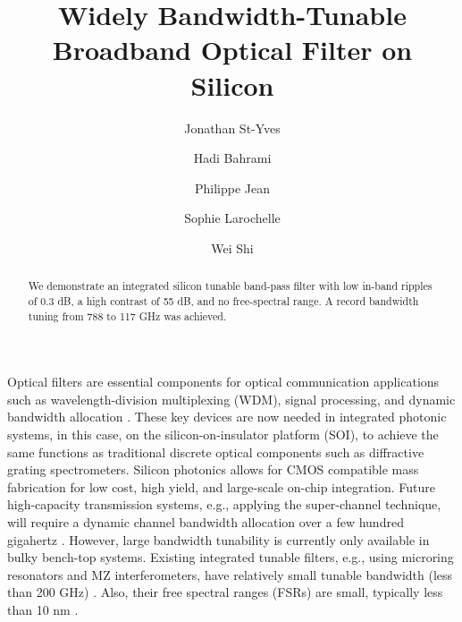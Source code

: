 \documentclass[osajnl,twocolumn,showpacs,superscriptaddress,10pt]{revtex4-1}
\begin{document}
\title{Widely Bandwidth-Tunable Broadband Optical Filter on Silicon}

\author{Jonathan St-Yves} 
\author{Hadi Bahrami}
\author{Philippe Jean}
\author{Sophie Larochelle}
\author{Wei Shi}


\begin{abstract}
We demonstrate an integrated silicon tunable band-pass filter with low in-band ripples of 0.3 dB, a high contrast of 55 dB, and no free-spectral range. A record bandwidth tuning from 788 to 117 GHz was achieved.
\end{abstract}



\maketitle



Optical filters are essential components for optical communication applications such as wavelength-division multiplexing (WDM), signal processing, and dynamic bandwidth allocation \cite{DynamicBW}.
These key devices are now needed in integrated photonic systems, in this case, on the silicon-on-insulator platform (SOI), to achieve the same functions as traditional discrete optical components such as diffractive grating spectrometers. 
Silicon photonics allows for CMOS compatible mass fabrication for low cost, high yield, and large-scale on-chip integration. 
Future high-capacity transmission systems, e.g., applying the super-channel technique, will require a dynamic channel bandwidth allocation over a few hundred gigahertz \cite{jinno2009spectrum}. 
However, large bandwidth tunability is currently only available in bulky bench-top systems. Existing integrated tunable filters, e.g., using microring resonators and MZ interferometers, have relatively small tunable bandwidth (less than 200 GHz)  \cite{ong2013ultra}. 
Also, their free spectral ranges (FSRs) are small, typically less than 10 nm \cite{ong2013ultra}. 
\end{document}
